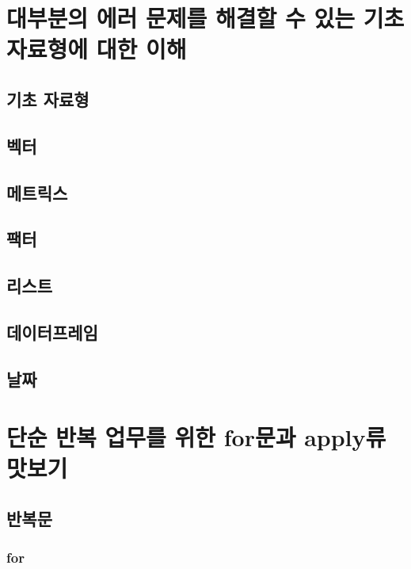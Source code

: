 \documentclass[]{book}
\theoremstyle{definition}
\theoremstyle{definition}
\theoremstyle{remark}
\begin{document}
\chapter{대부분의 에러 문제를 해결할 수 있는 기초 자료형에 대한
이해}\label{data-type}

\section{기초 자료형}\label{basic-data-type}

\section{벡터}\label{vector}

\section{메트릭스}\label{metrix}

\section{팩터}\label{factor}

\section{리스트}\label{list}

\section{데이터프레임}\label{data-frame}

\section{날짜}\label{date-time}

\chapter{단순 반복 업무를 위한 for문과 apply류 맛보기}\label{for-apply}

\section{반복문}\label{introduce-for}

\subsection{for}\label{for}
\end{document}
